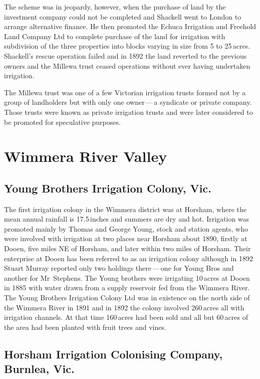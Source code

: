 The scheme was in jeopardy, however, when the purchase of land by the
investment company could not be completed and Shackell went to London
to arrange alternative finance.  He then promoted the Echuca
Irrigation and Freehold Land Company Ltd to complete purchase of the
land for irrigation with subdivision of the three properties into
blocks varying in size from 5 to 25\,acres.  Shackell's rescue operation
failed and in 1892 the land reverted to the previous owners and the
Millewa trust ceased operations without ever having undertaken
irrigation.

The Millewa trust was one of a few Victorian irrigation trusts formed
not by a group of landholders but with only one owner\,---\,a syndicate
or private company.  Those trusts were known as private irrigation
trusts and were later considered to be promoted for speculative
purposes.

\section*{Wimmera River Valley}

\subsection*{Young Brothers Irrigation Colony, Vic.}

The first irrigation colony in the Wimmera district was at Horsham,
where the mean annual rainfall is 17.5\,inches and summers are dry and
hot.  Irrigation was promoted mainly by Thomas and George Young, stock
and station agents, who were involved with irrigation at two places
near Horsham about 1890, firstly at Dooen, five miles NE of Horsham,
and later within two miles of Horsham.  Their enterprise at Dooen has
been referred to as an irrigation colony although in 1892 Stuart
Murray reported only two holdings there\,---\,one for Young Bros and
another for Mr~Stephens.  The Young brothers were irrigating 10\,acres
at Dooen in 1885 with water drawn from a supply reservoir fed from the
Wimmera River.  The Young Brothers Irrigation Colony Ltd was in
existence on the north side of the Wimmera River in 1891 and in 1892
the colony involved 260\,acres all with irrigation channels.  At that
time 160\,acres had been sold and all but 60\,acres of the area had
been planted with fruit trees and vines.

\subsection*{Horsham Irrigation Colonising Company, Burnlea, Vic.}

